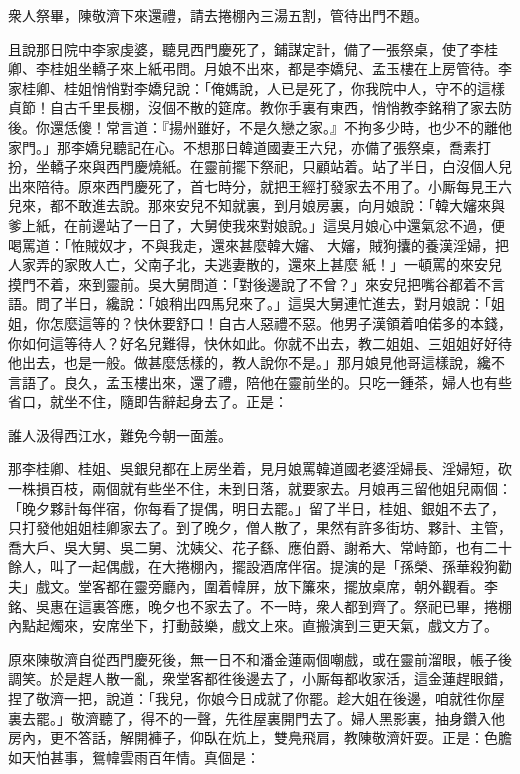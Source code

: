 衆人祭畢，陳敬濟下來還禮，請去捲棚內三湯五割，管待出門不題。

且說那日院中李家虔婆，聽見西門慶死了，鋪謀定計，{}備了一張祭桌，使了李桂卿、李桂姐坐轎子來上紙弔問。月娘不出來，都是李嬌兒、孟玉樓在上房管待。李家桂卿、桂姐悄悄對李嬌兒說：「俺媽說，人已是死了，你我院中人，守不的這樣貞節！自古千里長棚，沒個不散的筵席。教你手裏有東西，悄悄教李銘稍了家去防後。你還恁傻！常言道：『揚州雖好，不是久戀之家。』不拘多少時，也少不的離他家門。」那李嬌兒聽記在心。不想那日韓道國妻王六兒，亦備了張祭桌，喬素打扮，坐轎子來與西門慶燒紙。在靈前擺下祭祀，只顧站着。站了半日，白沒個人兒出來陪待。原來西門慶死了，首七時分，就把王經打發家去不用了。小厮每見王六兒來，都不敢進去說。那來安兒不知就裏，到月娘房裏，向月娘說：「韓大嬸來與爹上紙，在前邊站了一日了，大舅使我來對娘說。」這吳月娘心中還氣忿不過，便喝罵道：「恠賊奴才，不與我走，還來甚麼韓大嬸、𣭈大嬸，賊狗攮的養漢淫婦，把人家弄的家敗人亡，父南子北，夫逃妻散的，還來上甚麼𣭈紙！」一頓罵的來安兒摸門不着，來到靈前。吳大舅問道：「對後邊說了不曾？」來安兒把嘴谷都着不言語。問了半日，纔說：「娘稍出四馬兒來了。」這吳大舅連忙進去，對月娘說：「姐姐，你怎麼這等的？快休要舒口！自古人惡禮不惡。他男子漢領着咱偌多的本錢，你如何這等待人？好名兒難得，快休如此。你就不出去，教二姐姐、三姐姐好好待他出去，也是一般。做甚麼恁樣的，教人說你不是。」那月娘見他哥這樣說，纔不言語了。良久，孟玉樓出來，還了禮，陪他在靈前坐的。只吃一鍾茶，婦人也有些省口，就坐不住，隨即告辭起身去了。正是：

\begin{myquote}
誰人汲得西江水，難免今朝一面羞。
\end{myquote}

那李桂卿、桂姐、吳銀兒都在上房坐着，見月娘罵韓道國老婆淫婦長、淫婦短，砍一株損百枝，兩個就有些坐不住，未到日落，就要家去。月娘再三留他姐兒兩個：「晚夕夥計每伴宿，你每看了提偶，明日去罷。」留了半日，桂姐、銀姐不去了，只打發他姐姐桂卿家去了。到了晚夕，僧人散了，果然有許多街坊、夥計、主管，喬大戶、吳大舅、吳二舅、沈姨父、花子繇、應伯爵、謝希大、常峙節，也有二十餘人，叫了一起偶戲，在大捲棚內，擺設酒席伴宿。提演的是「孫榮、孫華殺狗勸夫」戲文。堂客都在靈旁廳內，圍着幃屏，放下簾來，擺放桌席，朝外觀看。李銘、吳惠在這裏答應，晚夕也不家去了。不一時，衆人都到齊了。祭祀已畢，捲棚內點起燭來，安席坐下，打動鼓樂，戲文上來。直搬演到三更天氣，戲文方了。

原來陳敬濟自從西門慶死後，無一日不和潘金蓮兩個嘲戲，或在靈前溜眼，帳子後調笑。於是趕人散一亂，衆堂客都徃後邊去了，小厮每都收家活，這金蓮趕眼錯，捏了敬濟一把，說道：「我兒，你娘今日成就了你罷。趁大姐在後邊，咱就徃你屋裏去罷。」敬濟聽了，得不的一聲，先徃屋裏開門去了。婦人黑影裏，抽身鑽入他房內，更不答話，解開褲子，仰臥在炕上，{}雙鳧飛肩，教陳敬濟奸耍。正是：色膽如天怕甚事，鴛幃雲雨百年情。真個是：

